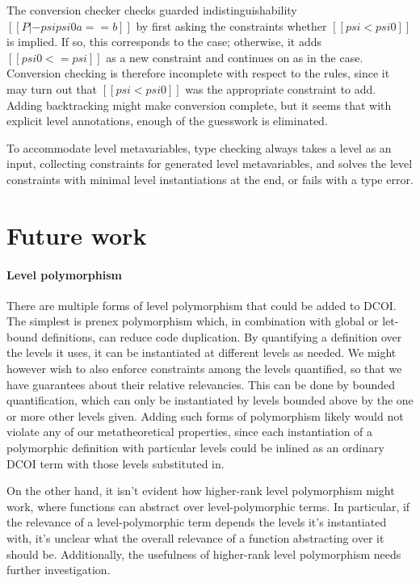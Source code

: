 \documentclass[acmsmall]{acmart}
\newcommand{\scw}[1]{}
\newcommand{\name}{DCOI\xspace}
\begin{document}
The conversion checker checks guarded indistinguishability $[[P |- psi psi0 a == b]]$
by first asking the constraints whether $[[psi < psi0]]$ is implied.
If so, this corresponds to the  case;
otherwise, it adds $[[psi0 <= psi]]$ as a new constraint
and continues on as in the  case.
Conversion checking is therefore incomplete with respect to the rules,
since it may turn out that $[[psi < psi0]]$ was the appropriate constraint to add.
Adding backtracking might make conversion complete,
but it seems that with explicit level annotations,
enough of the guesswork is eliminated.

To accommodate level metavariables, type checking always takes a level as an input,
collecting constraints for generated level metavariables,
and solves the level constraints with minimal level instantiations at the end,
or fails with a type error.

\scw{What is the largest example that you have checked with the implementation?}

\section{Future work}
\label{sec:extensions}

\paragraph{Level polymorphism}
There are multiple forms of level polymorphism that could be added to \name{}.
The simplest is prenex polymorphism which,
in combination with global or let-bound definitions, can reduce code duplication.
By quantifying a definition over the levels it uses,
it can be instantiated at different levels as needed.
We might however wish to also enforce constraints among the levels quantified,
so that we have guarantees about their relative relevancies.
This can be done by bounded quantification,
which can only be instantiated by levels bounded above by the one or more other levels given.
Adding such forms of polymorphism likely would not violate any of our metatheoretical properties,
since each instantiation of a polymorphic definition with particular levels could be inlined
as an ordinary \name{} term with those levels substituted in.

\ifextended
On the other hand, it isn't evident how higher-rank level polymorphism might work,
where functions can abstract over level-polymorphic terms.
In particular, if the relevance of a level-polymorphic term depends
the levels it's instantiated with,
it's unclear what the overall relevance of a function abstracting over it should be.
Additionally, the usefulness of higher-rank level polymorphism needs further investigation.
\end{document}

